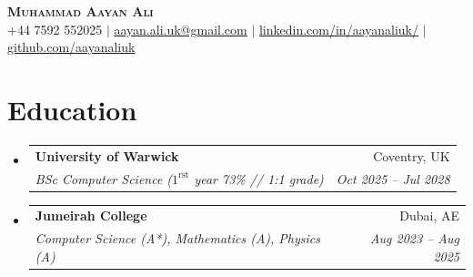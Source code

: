 \documentclass[letterpaper,11pt]{article}
\makeatletter
\newcommand{\resumeSubheading}[4]{
  \vspace{-2pt}\item
    \begin{tabular*}{0.97\textwidth}[t]{l@{\extracolsep{\fill}}r}
      \textbf{#1} & #2 \\
      \textit{\small#3} & \textit{\small #4} \\
    \end{tabular*}\vspace{-7pt}
}
\newcommand{\resumeSubHeadingListStart}{\begin{itemize}[leftmargin=0.15in, label={}]}
\newcommand{\resumeSubHeadingListEnd}{\end{itemize}}
\makeatother
\begin{document}

\begin{center}
    \textbf{\Huge \scshape Muhammad Aayan Ali} \\ \vspace{1pt}
    \small +44 7592 552025 $|$ 
    \href{mailto:aayan.ali.uk@gmail.com}{\underline{aayan.ali.uk@gmail.com}} $|$ 
    \href{https://www.linkedin.com/in/aayanaliuk/}{\underline{linkedin.com/in/aayanaliuk/}} $|$
    \href{https://github.com/aayanaliuk}{\underline{github.com/aayanaliuk}}
\end{center}



\section{Education}
  \resumeSubHeadingListStart
    \resumeSubheading
      {University of Warwick}{Coventry, UK}
      {BSc Computer Science ($1^{\text{rst}}$ year 73\% // 1:1 grade)}{Oct 2025 -- Jul 2028}
    \resumeSubheading
      {Jumeirah College}{Dubai, AE}
      {Computer Science (A*), Mathematics (A), Physics (A)}{Aug 2023 -- Aug 2025}
  \resumeSubHeadingListEnd


\end{document}
